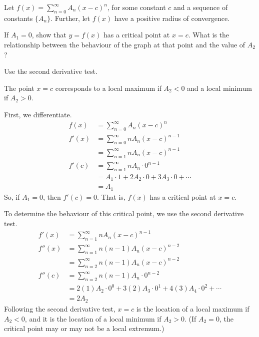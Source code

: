 \begin{question}
	Let $f(x)=\displaystyle\sum_{n=0}^{\infty}A_n(x-c)^n$, for some constant $c$ and a sequence of constants $\{A_n\}$. Further, let $f(x)$ have a positive radius of convergence.

	If $A_1=0$, show that $y=f(x)$ has a critical point at $x=c$. What is the relationship between the behaviour of the graph at that point and the value of $A_2$?
\end{question}
\begin{hint}
	Use the second derivative test.
\end{hint}
\begin{answer}
	The point $x=c$ corresponds to a local maximum if $A_2<0$ and a local minimum if $A_2>0$.
\end{answer}
\begin{solution}
	First, we differentiate.
	\begin{align*}
	f(x)&=\displaystyle\sum_{n=0}^{\infty}A_n(x-c)^n\\
	f'(x)&=\sum_{n=0}^{\infty}nA_n(x-c)^{n-1}\\
	&=\sum_{n=1}^{\infty}nA_n(x-c)^{n-1}\\
	f'(c)&=\sum_{n=1}^\infty nA_n\cdot 0^{n-1}\\
	&=A_1\cdot 1 + 2A_2\cdot0+3A_3\cdot0+\cdots\\
	&=A_1
	\end{align*}
	So, if $A_1=0$, then $f'(c)=0$. That is, $f(x)$ has a critical point at $x=c$.

	To determine the behaviour of this critical point, we use the second derivative test.
	\begin{align*}
	f'(x)&=\sum_{n=1}^{\infty}nA_n(x-c)^{n-1}\\
	f''(x)&=\sum_{n=1}^{\infty}n(n-1)A_n(x-c)^{n-2}\\
	&=\sum_{n=2}^{\infty}n(n-1)A_n(x-c)^{n-2}\\
	f''(c)&=\sum_{n=2}^{\infty}n(n-1)A_n\cdot 0^{n-2}\\
	&=2(1)A_2\cdot 0^0+3(2)A_3\cdot 0^1+4(3)A_4\cdot 0^2+\cdots\\
	&=2A_2
	\end{align*}
	Following the second derivative test, $x=c$	is the location of a local maximum if $A_2<0$, and it is the location of a local minimum if $A_2>0$. (If $A_2=0$, the critical point may or may not  be a local extremum.)
\end{solution}


